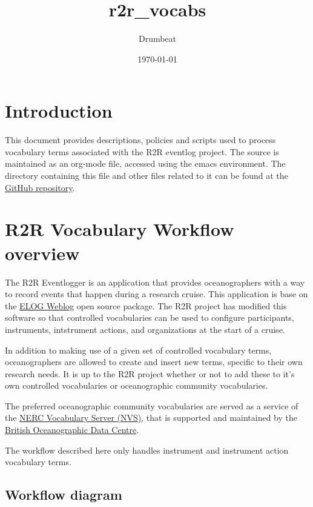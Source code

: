 \documentclass[11pt]{article}
\title{r2r\_{}vocabs}
\author{Drumbeat}
\date{\today}
\begin{document}
\maketitle

\setcounter{tocdepth}{3}
\tableofcontents
\vspace*{1cm}
\section{Introduction}
\label{sec-1}

This document provides descriptions, policies and scripts used to process vocabulary terms associated with the R2R eventlog project. The source is maintained as an org-mode file, accessed using the emacs environment. The directory containing this file and other files related to it can be found at the \href{https://github.com/amaffei/r2relogvocabs}{GitHub repository}.
\section{R2R Vocabulary Workflow overview}
\label{sec-2}

The R2R Eventlogger is an application that provides oceanographers with a way to record events that happen during a research cruise. This application is base on the \href{https://midas.psi.ch/elog/}{ELOG Weblog} open source package. The R2R project has modified this software so that controlled vocabularies can be used to configure participants, instruments, intstrument actions, and organizations at the start of a cruise.

In addition to making use of a given set of controlled vocabulary terms, oceanographers are allowed to create and insert new terms, specific to their own research needs. It is up to the R2R project whether or not to add these to it's own controlled vocabularies or oceanographic community vocabularies.

The preferred oceanographic community vocabularies are served as a service of the \href{http://www.bodc.ac.uk/products/web_services/vocab/}{NERC Vocabulary Server (NVS)}, that is supported and maintained by the \href{http://www.bodc.ac.uk/}{British Oceanographic Data Centre}. 

The workflow described here only handles instrument and instrument action vocabulary terms.
\subsection{Workflow diagram}
\label{sec-2-1}
\end{document}
